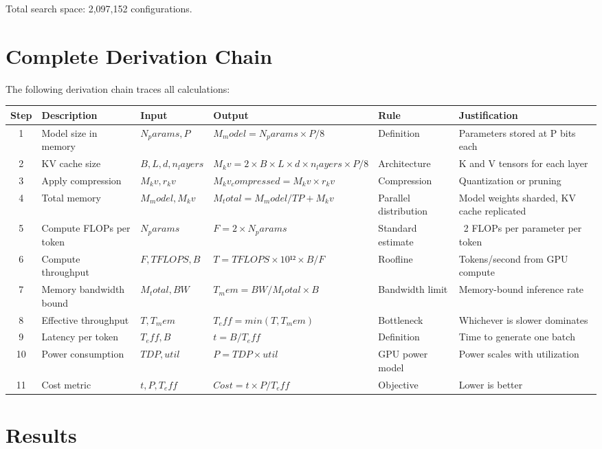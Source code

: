 \documentclass[11pt,a4paper]{article}
\begin{document}
Total search space: 2,097,152 configurations.

\section{Complete Derivation Chain}

The following derivation chain traces all calculations:

\begin{longtable}{|c|p{3cm}|p{2.5cm}|p{3cm}|p{2cm}|p{3cm}|}
\hline
Step & Description & Input & Output & Rule & Justification \\
\hline\endhead
1 & Model size in memory & $N_params, P$ & $M_model = N_params × P / 8$ & Definition & Parameters stored at P bits each \\
\hline
2 & KV cache size & $B, L, d, n_layers$ & $M_kv = 2 × B × L × d × n_layers × P / 8$ & Architecture & K and V tensors for each layer \\
\hline
3 & Apply compression & $M_kv, r_kv$ & $M_kv_compressed = M_kv × r_kv$ & Compression & Quantization or pruning \\
\hline
4 & Total memory & $M_model, M_kv$ & $M_total = M_model / TP + M_kv$ & Parallel distribution & Model weights sharded, KV cache replicated \\
\hline
5 & Compute FLOPs per token & $N_params$ & $F = 2 × N_params$ & Standard estimate & ~2 FLOPs per parameter per token \\
\hline
6 & Compute throughput & $F, TFLOPS, B$ & $T = TFLOPS × 10¹² × B / F$ & Roofline & Tokens/second from GPU compute \\
\hline
7 & Memory bandwidth bound & $M_total, BW$ & $T_mem = BW / M_total × B$ & Bandwidth limit & Memory-bound inference rate \\
\hline
8 & Effective throughput & $T, T_mem$ & $T_eff = min(T, T_mem)$ & Bottleneck & Whichever is slower dominates \\
\hline
9 & Latency per token & $T_eff, B$ & $t = B / T_eff$ & Definition & Time to generate one batch \\
\hline
10 & Power consumption & $TDP, util$ & $P = TDP × util$ & GPU power model & Power scales with utilization \\
\hline
11 & Cost metric & $t, P, T_eff$ & $Cost = t × P / T_eff$ & Objective & Lower is better \\
\hline
\end{longtable}

\section{Results}
\end{document}
